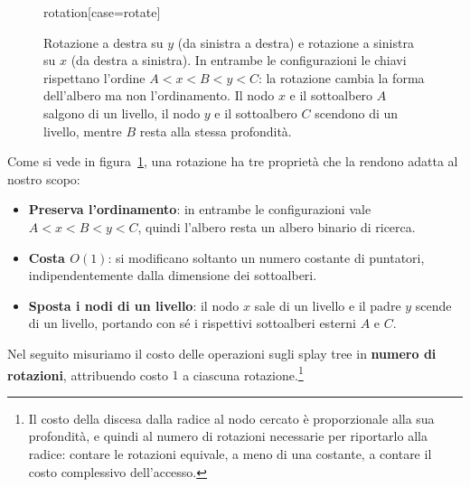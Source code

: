 \begin{figure}[htbp]
\centering
\begin{widget}{rotation}[case=rotate]
\end{widget}
\caption{Rotazione a destra su $y$ (da sinistra a destra) e rotazione a sinistra su $x$ (da destra a sinistra). In entrambe le configurazioni le chiavi rispettano l'ordine $A < x < B < y < C$: la rotazione cambia la forma dell'albero ma non l'ordinamento. Il nodo $x$ e il sottoalbero $A$ salgono di un livello, il nodo $y$ e il sottoalbero $C$ scendono di un livello, mentre $B$ resta alla stessa profondità.}
\label{fig:rotazione}
\end{figure}

Come si vede in figura~\ref{fig:rotazione}, una rotazione ha tre proprietà che la rendono adatta al nostro scopo:
\begin{itemize}
    \item \textbf{Preserva l'ordinamento}: in entrambe le configurazioni vale $A < x < B < y < C$, quindi l'albero resta un albero binario di ricerca.
    \item \textbf{Costa $O(1)$}: si modificano soltanto un numero costante di puntatori, indipendentemente dalla dimensione dei sottoalberi.
    \item \textbf{Sposta i nodi di un livello}: il nodo $x$ sale di un livello e il padre $y$ scende di un livello, portando con sé i rispettivi sottoalberi esterni $A$ e $C$.
\end{itemize}
Nel seguito misuriamo il costo delle operazioni sugli splay tree in \textbf{numero di rotazioni}, attribuendo costo $1$ a ciascuna rotazione.\footnote{Il costo della discesa dalla radice al nodo cercato è proporzionale alla sua profondità, e quindi al numero di rotazioni necessarie per riportarlo alla radice: contare le rotazioni equivale, a meno di una costante, a contare il costo complessivo dell'accesso.}

